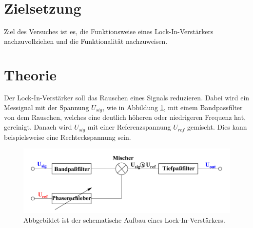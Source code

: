 \section{Zielsetzung}
Ziel des Versuches ist es, die Funktionsweise eines Lock-In-Verstärkers nachzuvollziehen und die Funktionalität nachzuweisen.


\section{Theorie \cite{V303}}
\label{sec:Theorie}

Der Lock-In-Verstärker soll das Rauschen eines Signals reduzieren.
Dabei wird ein Messignal mit der Spannung $U_{sig}$, wie in Abbildung \ref{fig:schema}, mit einem Bandpassfilter von dem Rauschen, welches eine deutlich höheren oder niedrigeren Frequenz hat, gereinigt.
Danach wird $U_{sig}$ mit einer Referenzspannung $U_{ref}$ gemischt.
Dies kann beispielsweise eine Rechteckspannung sein.


\begin{figure}[H]
    \caption{Abbgebildet ist der schematische Aufbau eines Lock-In-Verstärkers. \cite{v303}}
    \label{fig:schema}
    \includegraphics{Bilder/schema.png}
\end{figure}


